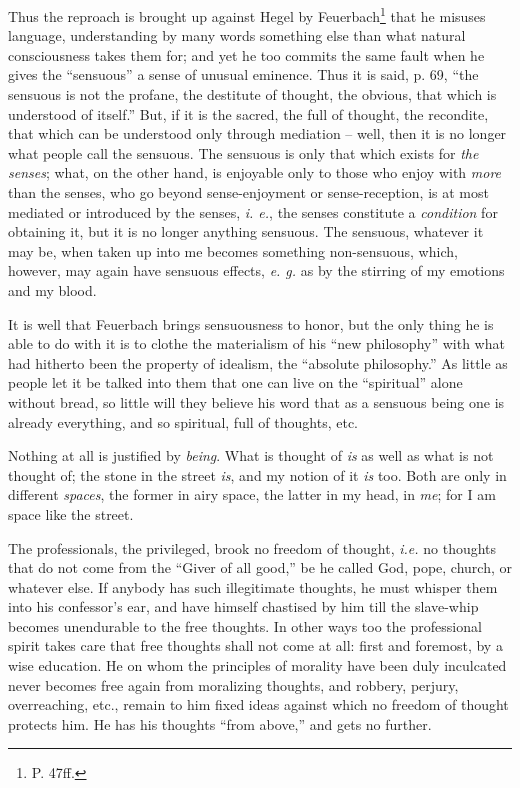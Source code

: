 \documentclass[12pt,a4paper]{book}
\begin{document}
Thus the reproach is brought up against Hegel by Feuerbach\footnote{P. 47ff.} 
that he misuses language, understanding by many words something else than what 
natural consciousness takes them for; and yet he too commits the same fault 
when he gives the ``sensuous'' a sense of unusual eminence. Thus it is said, 
p. 69, ``the sensuous is not the profane, the destitute of thought, the 
obvious, that which is understood of itself.'' But, if it is the sacred, the 
full of thought, the recondite, that which can be understood only through 
mediation -- well, then it is no longer what people call the sensuous. The 
sensuous is only that which exists for \textit{the senses}; what, on the other 
hand, is enjoyable only to those who enjoy with \textit{more} than the senses, 
who go beyond sense-enjoyment or sense-reception, is at most mediated or 
introduced by the senses, \textit{i. e.}, the senses constitute a 
\textit{condition} for obtaining it, but it is no longer anything sensuous. 
The sensuous, whatever it may be, when taken up into me becomes something 
non-sensuous, which, however, may again have sensuous effects, \textit{e. g.} 
as by the stirring of my emotions and my blood.

It is well that Feuerbach brings sensuousness to honor, but the only thing he 
is able to do with it is to clothe the materialism of his ``new philosophy'' 
with what had hitherto been the property of idealism, the ``absolute 
philosophy.'' As little as people let it be talked into them that one can 
live on the ``spiritual'' alone without bread, so little will they believe 
his word that as a sensuous being one is already everything, and so spiritual, 
full of thoughts, etc.

Nothing at all is justified by \textit{being}. What is thought of \textit{is} 
as well as what is not thought of; the stone in the street \textit{is}, and my 
notion of it \textit{is} too. Both are only in different \textit{spaces}, the 
former in airy space, the latter in my head, in \textit{me}; for I am space 
like the street.

The professionals, the privileged, brook no freedom of thought, \textit{i.e.} 
no thoughts that do not come from the ``Giver of all good,'' be he called 
God, pope, church, or whatever else. If anybody has such illegitimate 
thoughts, he must whisper them into his confessor's ear, and have himself 
chastised by him till the slave-whip becomes unendurable to the free thoughts. 
In other ways too the professional spirit takes care that free thoughts shall 
not come at all: first and foremost, by a wise education. He on whom the 
principles of morality have been duly inculcated never becomes free again from 
moralizing thoughts, and robbery, perjury, overreaching, etc., remain to him 
fixed ideas against which no freedom of thought protects him. He has his 
thoughts ``from above,'' and gets no further.
\end{document}
